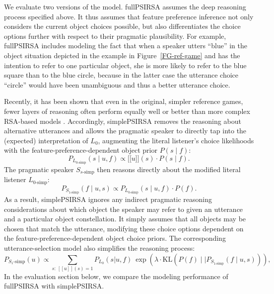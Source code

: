 \documentclass[10pt,a4paper]{article}
\newcommand{\sem}[1]{\mbox{$[\![$#1$]\!]$}}
\begin{document}
We evaluate two versions of the model. 
fullPSIRSA assumes the deep reasoning process specified above. 
It thus assumes that feature preference inference not only considers the current object choices possible, but also differentiates the choice options further with respect to their pragmatic plausibility. 
For example, fullPSIRSA includes modeling the fact that when a speaker utters ``blue'' in the object situation depicted in the example in Figure~\ref{FG-ref-game} and has the intention to refer to one particular object, she is more likely to refer to the blue square than to the blue circle, because in the latter case the utterance choice ``circle'' would have been unambiguous and thus a better utterance choice.


Recently, it has been shown that even in the original, simpler reference games, fewer layers of reasoning often perform equally well or better than more complex RSA-based models \cite{sikos2019}.
Accordingly, simplePSIRSA removes the reasoning about alternative utterances and allows the pragmatic speaker to directly tap into the (expected) interpretation of $L_0$, augmenting the literal listener's choice likelihoods with the feature-preference-dependent object prior $P(s\mid f)$:
$$P_{L_{0\textrm{-simp}}}(s\mid u,f) \propto \sem{$u$}(s) \cdot P(s\mid f).$$
The pragmatic speaker $S_{s\textrm{-simp}}$ then reasons directly about the modified literal listener $L_{0\textrm{-simp}}$: 
$$P_{S_{1\textrm{-simp}}}(f\mid u,s) \propto P_{L_{0\textrm{-simp}}}(s\mid u,f) \cdot P(f).$$
As a result, simplePSIRSA ignores any indirect pragmatic reasoning considerations about which object the speaker may refer to given an utterance and a particular object constellation.
It simply assumes that all objects may be chosen that match the utterance, modifying these choice options dependent on the feature-preference-dependent object choice priors. The corresponding utterance-selection model also simplifies the reasoning process:
$$P_{S_1\textrm{-simp}}(u) \propto \sum_{s:\  [\![u]\!](s)=1} P_{L_0}(s|u,f)\ \exp(\lambda \cdot \textrm{KL}(P(f)\mid\mid P_{S_{1\textrm{-simp}}}(f\mid u,s))),$$
In the evaluation section below, we compare the modeling performance of fullPSIRSA with simplePSIRSA. 

\end{document}
